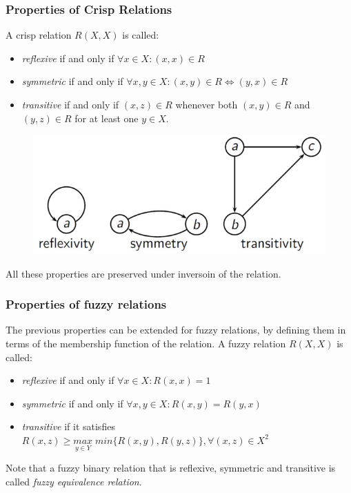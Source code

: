 \documentclass{article}
\begin{document}
\subsubsection{Properties of Crisp Relations}
A crisp relation $R(X,X)$ is called:
\begin{itemize}
    \item \textit{reflexive} if and only if $\forall x\in X: (x,x)\in R$
    \item \textit{symmetric} if and only if $\forall x,y\in X:(x,y)\in R\Leftrightarrow (y,x)\in R$
    \item \textit{transitive} if and only if $(x,z)\in R$ whenever both
          $(x,y)\in R$ and $(y,z)\in R$ for at least one $y\in X$.
\end{itemize}

\begin{figure}[H]
    \centering
    \includegraphics[scale=0.5]{images/RULES_CRISP.png}
\end{figure}
All these properties are preserved under inversoin of the relation.

\subsubsection{Properties of fuzzy relations}
The previous properties can be extended for fuzzy relations, by defining them in terms of the
membership function of the relation. A fuzzy relation $R(X,X)$ is called:
\begin{itemize}
    \item \textit{reflexive} if and only if $\forall x\in X:R(x,x)=1$
    \item \textit{symmetric} if and only if $\forall x,y\in X:R(x,y)=R(y,x)$
    \item \textit{transitive} if it satisfies $R(x,z)\geq\underset{y\in Y}{max}\;min\{R(x,y),R(y,z)\},\forall (x,z)\in X^2$
\end{itemize}

Note that a fuzzy binary relation that is reflexive, symmetric and transitive is called \textit{fuzzy equivalence
    relation}.
\end{document}
